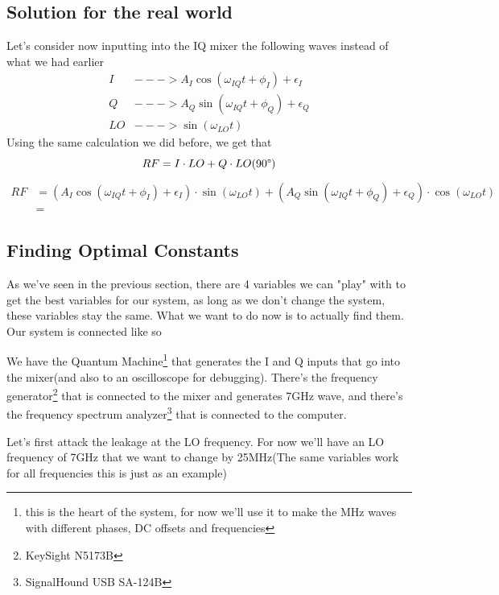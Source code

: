 \documentclass[english, a4paper, 12pt, twoside]{article}
\numberwithin{equation}{section} %
\begin{document}
\subsection{Solution for the real world} \label{sec:solution_real_world}
Let's consider now inputting into the IQ mixer the following waves instead of what we had earlier
\begin{align*}
    I &---> A_I\cos(\omega_{IQ} t + \phi_I) + \epsilon_I\\
    Q &---> A_Q\sin(\omega_{IQ} t + \phi_Q) + \epsilon_Q\\
    LO &---> \sin(\omega_{LO}t)
\end{align*}
Using the same calculation we did before, we get that
$$RF = I\cdot LO + Q\cdot LO(90\degree)$$
\begin{align}
RF &= (A_I\cos(\omega_{IQ} t + \phi_I) + \epsilon_I)\cdot \sin(\omega_{LO}t) + (A_Q\sin(\omega_{IQ} t + \phi_Q) + \epsilon_Q)\cdot \cos(\omega_{LO}t) \\
&=
\end{align}
\subsection{Finding Optimal Constants} %
As we've seen in the previous section, there are 4 variables we can "play" with to get the best variables for our system, as long as we don't change the system, these variables stay the same. What we want to do now is to actually find them. Our system is connected like so

We have the Quantum Machine\footnote{this is the heart of the system, for now we'll use it to make the MHz waves with different phases, DC offsets and frequencies} that generates the I and Q inputs that go into the mixer(and also to an oscilloscope for debugging). There's the frequency generator\footnote{KeySight N5173B} that is connected to the mixer and generates 7GHz wave, and there's the frequency spectrum analyzer\footnote{SignalHound USB SA-124B} that is connected to the computer.

Let's first attack the leakage at the LO frequency. For now we'll have an LO frequency of 7GHz that we want to change by 25MHz(The same variables work for all frequencies this is just as an example)
\end{document}
